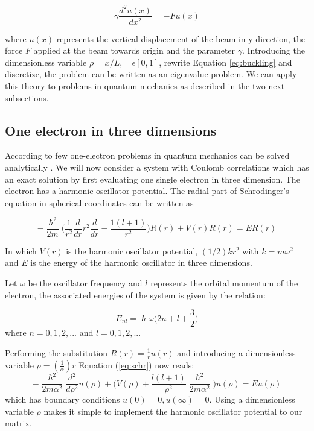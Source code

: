 \documentclass{article}
\begin{document}
\begin{equation}
    \gamma \frac{d^2 u(x)}{dx^2} = -Fu(x)
    \label{eq:buckling}
\end{equation}

where $u(x)$ represents the vertical displacement of the beam in y-direction, the force $F$ applied at the beam towards origin and the parameter $\gamma$. Introducing the dimensionless variable $\rho = x/L, \quad \epsilon [0,1]$, rewrite Equation \ref{eq:buckling} and discretize, the problem can be written as an eigenvalue problem. We can apply this theory to problems in quantum mechanics as described in the two next subsections.  

\subsection{One electron in three dimensions}
\label{sec: oneelec}
According to \cite{electrons} few one-electron problems in quantum mechanics can be solved analytically . We will now consider a system with Coulomb correlations which has an exact solution by first evaluating one single electron in three dimension. The electron has a harmonic oscillator potential. The radial part of Schrodinger's equation in spherical coordinates can be written as 

\begin{equation}
    -\frac{\hslash^2}{2m}\Big(\frac{1}{r^2}\frac{d}{dr}r^2\frac{d}{dr}-\frac{1(l+1)}{r^2}\Big)R(r) + V(r)R(r) = ER(r)
    \label{eq:schr}
\end{equation}

In which $V(r)$ is the harmonic oscillator potential, $(1/2)kr^2$ with $k = m\omega^2$ and $E$ is the energy of the harmonic oscillator in three dimensions.

\medskip

Let $\omega$ be the oscillator frequency and $l$ represents the orbital momentum of the electron, the associated energies of the system is given by the relation: 

\begin{equation}
E_{nl} = \hslash\omega\bigg(2n + l + \frac{3}{2}\bigg)
\end{equation}
where $n = 0,1,2,...$ and $l= 0,1,2,...$

\medskip

Performing the substitution $R(r) = \frac{1}{r}u(r)$ and introducing a dimensionless variable $\rho = (\frac{1}{\alpha})r$ Equation (\ref{eq:schr}) now reads: 
\begin{equation}
    -\frac{\hslash^2}{2m\alpha^2}\frac{d^2}{d\rho^2}u(\rho) + \Big(V(\rho) + \frac{l(l+1)}{\rho^2}\frac{\hslash^2}{2m\alpha^2}\Big)u(\rho) = Eu(\rho)
    \label{eq:schr2}
\end{equation}
which has boundary conditions $u(0) = 0, u(\infty)=0$. Using a dimensionless variable $\rho$ makes it simple to implement the harmonic oscillator potential to our matrix. 
\end{document}
